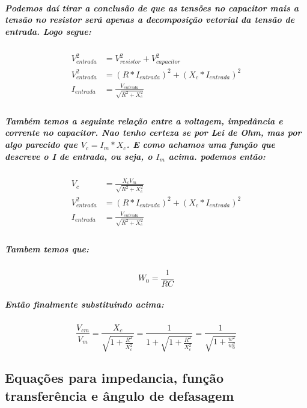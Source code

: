 \documentclass[12pt,twoside, a4paper, twocolumn]{article}
\begin{document}
\subparagraph*{Podemos daí tirar a conclusão de que as tensões no capacitor mais a tensão no resistor será apenas a decomposição vetorial da tensão de entrada. Logo segue:}

\begin{equation}
  \begin{aligned}
    V_{entrada}^2 & = V_{resistor}^2 + V_{capacitor}^2          \\
    V_{entrada}^2 & = (R*I_{entrada})^2 + (X_c * I_{entrada})^2 \\
    I_{entrada}   & = \frac{V_{entrada}}{\sqrt{R^2 + X_c^2}}    \\
  \end{aligned}
\end{equation}

\subparagraph*{Também temos a seguinte relação entre a voltagem, impedância e corrente no capacitor. Nao tenho certeza se por Lei de Ohm, mas por algo parecido que $V_c = I_m * X_c$. E como achamos uma função que descreve o I de entrada, ou seja, o $I_m$ acima. podemos então:}

\begin{equation}
  \begin{aligned}
    V_{c}         & = \frac{X_c V_m}{\sqrt{R^2 + X_c^2}}        \\
    V_{entrada}^2 & = (R*I_{entrada})^2 + (X_c * I_{entrada})^2 \\
    I_{entrada}   & = \frac{V_{entrada}}{\sqrt{R^2 + X_c^2}}    \\
  \end{aligned}
\end{equation}

\subparagraph*{Tambem temos que:}

\begin{equation}
  W_0 = \frac{1}{RC}
\end{equation}

\subparagraph*{Então finalmente substituindo acima:}

\begin{equation}
  \frac{V_{cm}}{V_{m}} = \frac{X_c}{\sqrt{1+ \frac{R^2}{X_c^2} }} = \frac{1}{1+ \sqrt{1+ \frac{R^2}{X_c^2} }} = \frac{1}{\sqrt{1+ \frac{w^2}{w_0^2}}}
\end{equation}

\subsection{Equações para impedancia, função transferência e ângulo de defasagem}
\end{document}
